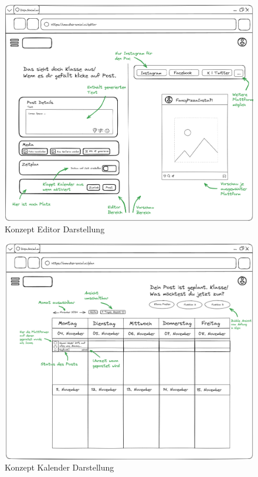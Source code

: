 \begin{figure}[htbp]
    \centering
    \includegraphics[width=\textwidth]{abbildungen/Konzept/Konzept Editor}
    \caption[]{Konzept Editor Darstellung}
    \label{fig:editor-concept}
\end{figure}
\newpage

\begin{figure}[htbp]
    \centering
    \includegraphics[width=\textwidth]{abbildungen/Konzept/Konzept Kalender}
    \caption[]{Konzept Kalender Darstellung}
    \label{fig:calendar-concept}
\end{figure}
\newpage

